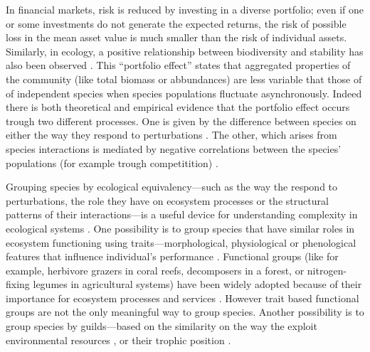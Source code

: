 \documentclass[a4paper]{article}
\begin{document}
In financial markets, risk is reduced by investing in a diverse portfolio; even if one or some investments do not generate the expected returns, the risk of possible loss in the mean asset value is much smaller than the risk of individual assets.
Similarly, in ecology, a positive relationship between biodiversity and stability has also been observed \autocite{Tilman1996, Doak1998,Tilman1998}.
This ``portfolio effect'' states that aggregated properties of the community (like total biomass or abbundances) are less variable that those of of independent species when species populations fluctuate asynchronously.
Indeed there is both theoretical \autocite{Tilman1998} and empirical \autocite{Tilman1996,Tilman2006, Valone2008, Hector2010} evidence that the portfolio effect occurs trough two different processes.
One is given by the difference between species on either the way they respond to perturbations \autocite{Loreau2001}.
The other, which arises from species interactions is mediated by negative correlations between the species' populations (for example trough competitition) \autocite{Doak1998, Tilman1999, Lehman2000, Tilman2006}.

Grouping species by ecological equivalency---such as the way the respond to perturbations, the role they have on ecosystem processes or the structural patterns of their interactions---is a useful device for understanding complexity in ecological systems \autocite{Naeem1998}.
One possibility is to group species that have similar roles in ecosystem functioning using traits---morphological, physiological or phenological features that influence individual's performance \autocite{Raunkiaer1934, Fonseca2001, Mouillot2013}.
Functional groups (like for example, herbivore grazers in coral reefs, decomposers in a forest, or nitrogen-fixing legumes in agricultural systems) have been widely adopted because of their importance for ecosystem processes and services \autocite{Daz2001, Tilman2001a, Wardle2005}.
However trait based functional groups are not the only meaningful way to group species.
Another possibility is to group species by guilds---based on the similarity on the way the exploit environmental resources \autocite{Root1967}, or their trophic position \autocite{Hairston1960}.
\end{document}
